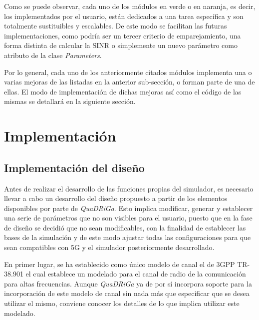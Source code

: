 Como se puede observar, cada uno de los módulos en verde o en naranja, es decir, los implementados por el usuario, están dedicados a una tarea específica y son totalmente sustituibles y escalables. De este modo se facilitan las futuras implementaciones, como podría ser un tercer criterio de emparejamiento, una forma distinta de calcular la SINR o simplemente un nuevo parámetro como atributo de la clase \textit{Parameters}.

Por lo general, cada uno de los anteriormente citados módulos implementa una o varias mejoras de las listadas en la anterior sub-sección, o forman parte de una de ellas. El modo de implementación de dichas mejoras así como el código de las mismas se detallará en la siguiente sección. 

\section{Implementación}

\subsection{Implementación del diseño}

Antes de realizar el desarrollo de las funciones propias del simulador, es necesario llevar a cabo un desarrollo del diseño propuesto a partir de los elementos disponibles por parte de \textit{QuaDRiGa}. Esto implica modificar, generar y establecer una serie de parámetros que no son visibles para el usuario, puesto que en la fase de diseño se decidió que no sean modificables, con la finalidad de establecer las bases de la simulación y de este modo ajustar todas las configuraciones para que sean compatibles con 5G y el simulador posteriormente desarrollado.

En primer lugar, se ha establecido como único modelo de canal el de 3GPP TR-38.901 \cite{3gpphighfreq} el cual establece un modelado para el canal de radio de la comunicación para altas frecuencias. Aunque \textit{QuaDRiGa} ya de por sí incorpora soporte para la incorporación de este modelo de canal sin nada más que especificar que se desea utilizar el mismo, conviene conocer los detalles de lo que implica utilizar este modelado.

